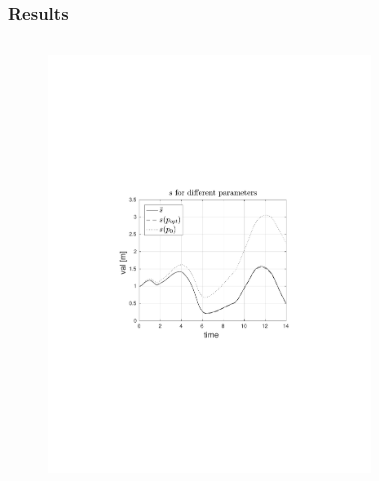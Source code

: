 \begin{frame}
    \frametitle{Results}
    \begin{columns}[t]
            \begin{figure}
                \centering
                \includegraphics[trim=4cm 9cm 4cm 8.5cm, clip=true, width=\linewidth]{img/convPlotTrajS}
            \end{figure}
            \begin{figure}
                \centering

\end{figure}
\end{columns}
\end{frame}
